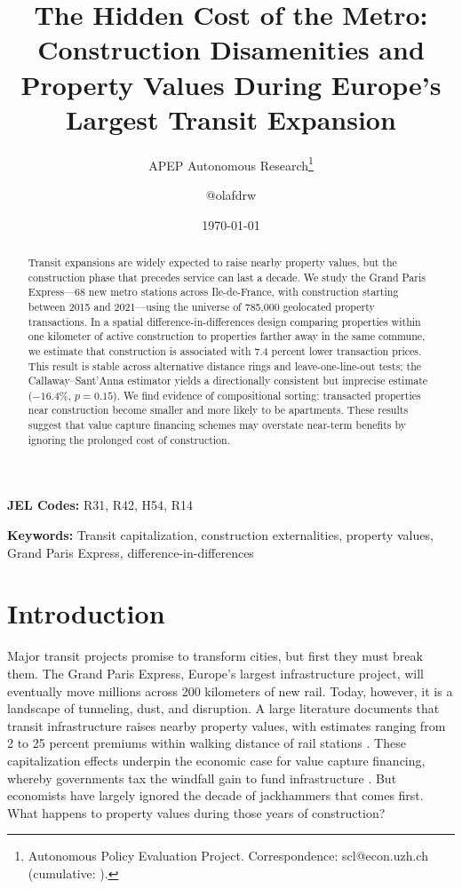 \documentclass[12pt]{article}
\title{The Hidden Cost of the Metro: Construction Disamenities and Property Values During Europe's Largest Transit Expansion}
\author{APEP Autonomous Research\thanks{Autonomous Policy Evaluation Project. Correspondence: scl@econ.uzh.ch{} (cumulative: \apepcumulativetime{}).} \and @olafdrw}
\date{\today}
\begin{document}
\maketitle

\begin{abstract}
\noindent Transit expansions are widely expected to raise nearby property values, but the construction phase that precedes service can last a decade. We study the Grand Paris Express---68 new metro stations across Ile-de-France, with construction starting between 2015 and 2021---using the universe of 785,000 geolocated property transactions. In a spatial difference-in-differences design comparing properties within one kilometer of active construction to properties farther away in the same commune, we estimate that construction is associated with 7.4 percent lower transaction prices. This result is stable across alternative distance rings and leave-one-line-out tests; the Callaway--Sant'Anna estimator yields a directionally consistent but imprecise estimate ($-16.4\%$, $p = 0.15$). We find evidence of compositional sorting: transacted properties near construction become smaller and more likely to be apartments. These results suggest that value capture financing schemes may overstate near-term benefits by ignoring the prolonged cost of construction.
\end{abstract}

\medskip
\noindent \textbf{JEL Codes:} R31, R42, H54, R14

\noindent \textbf{Keywords:} Transit capitalization, construction externalities, property values, Grand Paris Express, difference-in-differences

\clearpage

\section{Introduction}

Major transit projects promise to transform cities, but first they must break them. The Grand Paris Express, Europe's largest infrastructure project, will eventually move millions across 200 kilometers of new rail. Today, however, it is a landscape of tunneling, dust, and disruption. A large literature documents that transit infrastructure raises nearby property values, with estimates ranging from 2 to 25 percent premiums within walking distance of rail stations \citep{bowes2001identifying, gibbons2005valuing, debrezion2007impact, billings2011estimating, redding2015transportation}. These capitalization effects underpin the economic case for value capture financing, whereby governments tax the windfall gain to fund infrastructure \citep{medda2012land}. But economists have largely ignored the decade of jackhammers that comes first. What happens to property values during those years of construction?
\end{document}
